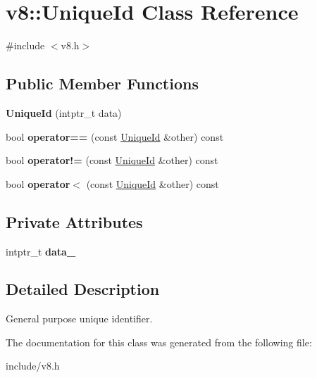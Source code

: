 \hypertarget{classv8_1_1_unique_id}{}\section{v8\+:\+:Unique\+Id Class Reference}
\label{classv8_1_1_unique_id}


{\ttfamily \#include $<$v8.\+h$>$}

\subsection*{Public Member Functions}
\begin{DoxyCompactItemize}
\item 
{\bfseries Unique\+Id} (intptr\+\_\+t data)\hypertarget{classv8_1_1_unique_id_a94ba72efbc70dee13184b444c3d2399a}{}\label{classv8_1_1_unique_id_a94ba72efbc70dee13184b444c3d2399a}

\item 
bool {\bfseries operator==} (const \hyperlink{classv8_1_1_unique_id}{Unique\+Id} \&other) const \hypertarget{classv8_1_1_unique_id_a157844a8c7cbeb43282670f7a233e1d0}{}\label{classv8_1_1_unique_id_a157844a8c7cbeb43282670f7a233e1d0}

\item 
bool {\bfseries operator!=} (const \hyperlink{classv8_1_1_unique_id}{Unique\+Id} \&other) const \hypertarget{classv8_1_1_unique_id_a16bdf3163cdacfaabed5cc253d948c10}{}\label{classv8_1_1_unique_id_a16bdf3163cdacfaabed5cc253d948c10}

\item 
bool {\bfseries operator$<$} (const \hyperlink{classv8_1_1_unique_id}{Unique\+Id} \&other) const \hypertarget{classv8_1_1_unique_id_a189ed3914fea0157f00892b5e8f081f3}{}\label{classv8_1_1_unique_id_a189ed3914fea0157f00892b5e8f081f3}

\end{DoxyCompactItemize}
\subsection*{Private Attributes}
\begin{DoxyCompactItemize}
\item 
intptr\+\_\+t {\bfseries data\+\_\+}\hypertarget{classv8_1_1_unique_id_a129f157fb2e36618a71649b3676edb30}{}\label{classv8_1_1_unique_id_a129f157fb2e36618a71649b3676edb30}

\end{DoxyCompactItemize}


\subsection{Detailed Description}
General purpose unique identifier. 

The documentation for this class was generated from the following file\+:\begin{DoxyCompactItemize}
\item 
include/v8.\+h\end{DoxyCompactItemize}
